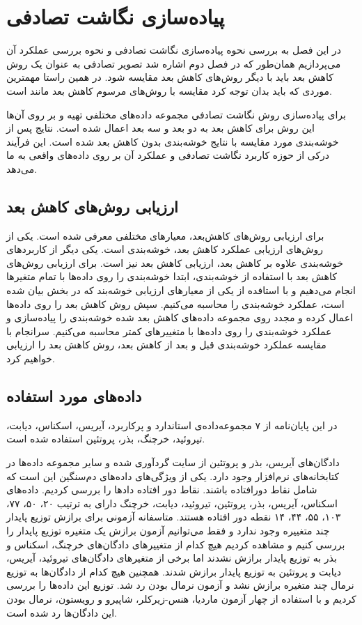 \chapter{
پیاده‌سازی نگاشت تصادفی
}

در این فصل به بررسی نحوه پیاده‌سازی نگاشت تصادفی و نحوه بررسی عملکرد آن می‌پردازیم همان‌طور که در فصل دوم 
اشاره شد تصویر تصادفی به عنوان یک روش کاهش بعد باید با دیگر روش‌های کاهش بعد مقایسه شود. در همین راستا مهمترین موردی که باید بدان توجه کرد مقایسه با روش‌های مرسوم کاهش بعد مانند
است.

برای پیاده‌سازی روش نگاشت تصادفی مجموعه داده‌های مختلفی تهیه‌ و بر روی آن‌ها این روش برای کاهش بعد به دو بعد و سه بعد اعمال شده است. نتایج پس از خوشه‌بندی مورد مقایسه با نتایج خوشه‌بندی بدون کاهش بعد شده است. این فرآیند درکی از حوزه کاربرد نگاشت تصادفی و عملکرد آن بر روی داده‌های واقعی به ما می‌دهد.

\section{
ارزیابی روش‌های کاهش بعد
}

برای ارزیابی روش‌های کاهش‌بعد، معیا‌ر‌های مختلفی معرفی شده است.%
\cite{gracia2014methodology}
یکی از روش‌های ارزیابی عملکرد کاهش بعد، خوشه‌بندی است. یکی دیگر از کاربردهای خوشه‌بندی علاوه بر کاهش بعد، ارزیابی کاهش بعد نیز است. برای ارزیابی روش‌های کاهش بعد با استفاده از خوشه‌بندی، ابتدا خوشه‌بندی را روی داده‌ها با تمام متغیرها انجام می‌دهیم و با استافده از یکی از معیارهای ارزیابی خوشه‌بند که در بخش 
بیان شده است، عملکرد خوشه‌بندی را محاسبه می‌کنیم. سپش روش کاهش بعد را روی داده‌ها اعمال کرده و مجدد روی مجموعه داده‌های کاهش بعد شده خوشه‌بندی را پیاده‌سازی و عملکرد خوشه‌بندی را روی داده‌ها با متغییر‌های کمتر محاسبه می‌کنیم. سرانجام با مقایسه عملکرد خوشه‌بندی قبل و بعد از کاهش بعد، روش کاهش بعد را ارزیابی خواهیم کرد.

\section{
داده‌‌های مورد استفاده
}

در این پایان‌نامه از ۷ مجموعه‌داده‌ی استاندارد و پرکاربرد، آیریس، اسکناس، دیابت، تیروئید، خرچنگ، بذر، پروتئین استفاده شده است.

دادگا‌ن‌های آیریس، بذر و پروتئین از سایت 
گردآوری شده و سایر مجموعه داده‌ها در کتابخانه‌های نرم‌افزار 
وجود دارد. یکی از ویژگی‌های داده‌های دم‌سنگین این است که شامل نقاط دورافتاده باشند. نقاط دور افتاده داد‌ها را بررسی کردیم. داده‌های اسکناس، آیریس، بذر، پروتئین، تیروئید، دیابت، خرچنگ دارای به ترتیب ۲۰، ۵۰، ۷۷، ۱۰۳، ۵۵، ۴۴، ۱۴ نقطه دور افتاده هستند. متاسفانه آزمونی برای برازش توزیع پایدار چند متغییره وجود ندارد و فقط می‌توانیم آزمون برازش یک متغیره توزیع پایدار را بررسی کنیم و مشاهده کردیم هیچ کدام از متغییر‌های دادگان‌های خرچنگ، اسکناس و بذر به توزیع پایدار برازش نشدند اما برخی از متغیرهای دادگان‌های تیروئید، آیریس، دیابت و پروتئین به توزیع پایدار برازش شدند. همچنین هیچ کدام از دادگان‌ها به توزیع نرمال چند متغیره برازش نشد و آزمون نرمال بودن رد شد. توزیع این داده‌ها را بررسی کردیم و با استفاده از چهار آزمون ماردیا، هنس-زیرکلر، شاپیرو و رویستون، نرمال بودن این دادگان‌ها رد شده است.

